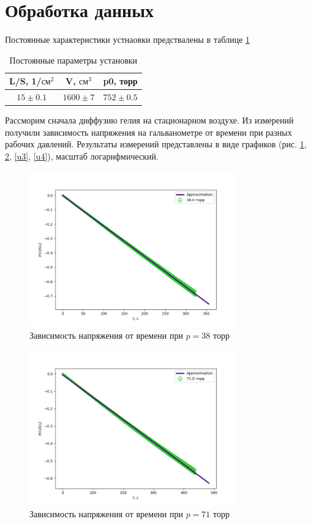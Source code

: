 \documentclass[a4paper,12pt]{article} %
\begin{document}
\section{Обработка данных}
Постоянные характеристики устнаовки предствалены в таблице \ref{const}
\begin{table} \label{const} \caption{Постоянные параметры установки}
\begin{tabular}{|c|c|c|}
\hline 
L/S, 1/$\text{см}^2$ & V, $\text{см}^3$ & p0, торр \\ 
\hline 
$ 15 \pm 0.1$ & $1600 \pm 7$ & $752 \pm 0.5$ \\ 
\hline 
\end{tabular} 
\end{table}
Рассморим сначала диффузию гелия на стационарном воздухе.
Из измерений получили зависимость напряжения на гальванометре от времени при разных рабочих давлений. Результаты измерений представлены в виде графиков (рис. \ref{u1}, \ref{u2}, \ref{u3}, \ref{u4}), масштаб логарифмический.

\begin{figure}[h!]
\begin{center}
\includegraphics[width=0.8\textwidth]{U(t)+38}
\end{center}
\caption{Зависимость напряжения от времени при $p=38$ торр} \label{u1}
\end{figure}

\begin{figure}[h!]
\begin{center}
\includegraphics[width=0.8\textwidth]{U(t)+71}
\end{center}
\caption{Зависимость напряжения от времени при $p=71$ торр} \label{u2}
\end{figure}
\end{document}
